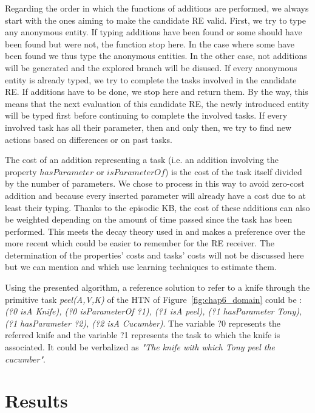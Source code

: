 Regarding the order in which the functions of additions are performed, we always start with the ones aiming to make the candidate RE valid. First, we try to type any anonymous entity. If typing additions have been found or some should have been found but were not, the function stop here. In the case where some have been found we thus type the anonymous entities. In the other case, not additions will be generated and the explored branch will be disused. If every anonymous entity is already typed, we try to complete the tasks involved in the candidate RE. If additions have to be done, we stop here and return them. By the way, this means that the next evaluation of this candidate RE, the newly introduced entity will be typed first before continuing to complete the involved tasks. If every involved task has all their parameter, then and only then, we try to find new actions based on differences or on past tasks.

The cost of an addition representing a task (i.e. an addition involving the property $hasParameter$ or $isParameterOf$) is the cost of the task itself divided by the number of parameters. We chose to process in this way to avoid zero-cost addition and because every inserted parameter will already have a cost due to at least their typing. Thanks to the episodic KB, the cost of these additions can also be weighted depending on the amount of time passed since the task has been performed. This meets the decay theory used in \cite{williams_toward_2020} and makes a preference over the more recent which could be easier to remember for the RE receiver. The determination of the properties' costs and tasks' costs will not be discussed here but we can mention \cite{belke_2002_tracking} and \cite{koolen_2012_learning} which use learning techniques to estimate them.

Using the presented algorithm, a reference solution to refer to a knife through the primitive task \textit{peel(A,V,K)} of the HTN of Figure~\ref{fig:chap6_domain} could be : \textit{(?0 isA Knife), (?0 isParameterOf ?1), (?1 isA peel), (?1 hasParameter Tony), (?1 hasParameter ?2), (?2 isA Cucumber)}. The variable ?0 represents the referred knife and the variable ?1 represents the task to which the knife is associated. It could be verbalized as \textit{"The knife with which Tony peel the cucumber"}.

\section{Results}

